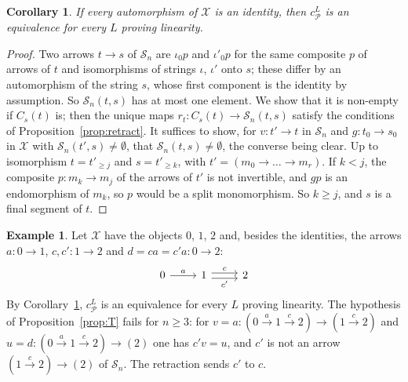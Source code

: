 \documentclass[11pt]{amsart}
\newtheorem{cor}[thm]{Corollary}
\theoremstyle{definition}
\newtheorem{ex}[thm]{Example}
\newcommand{\cX}{\mathcal X}
\newcommand{\cP}{\mathcal P}
\newcommand{\cS}{\mathcal S}
\begin{document}
\begin{cor}\label{cor:rigid}
If every automorphism of $\cX$ is an identity, then $c^L_\cP$ is an
equivalence for every $L$ proving linearity.
\end{cor}
\begin{proof}
Two arrows $t\to s$ of $\cS_n$ are $\iota_0p$ and $\iota'_0p$ for the
same composite $p$ of arrows of $t$ and isomorphisms of strings
$\iota$, $\iota'$ onto $s$; these differ by an automorphism of the
string $s$, whose first component is the identity by assumption. So $\cS_n(t,s)$ has
at most one element. We show that it is non-empty if $C_s(t)$ is;
then the unique maps $r_t\colon C_s(t)\to\cS_n(t,s)$ satisfy the
conditions of Proposition~\ref{prop:retract}. It suffices to show, for
$v\colon t'\to t$ in $\cS_n$ and $g\colon t_0\to s_0$ in $\cX$ with
$\cS_n(t',s)\ne\emptyset$, that $\cS_n(t,s)\ne\emptyset$, the converse
being clear. Up to isomorphism $t=t'_{\ge j}$ and $s=t'_{\ge k}$, with
$t'=(m_0\to\dots\to m_r)$. If $k<j$, the composite $p\colon m_k\to m_j$
of the arrows of $t'$ is not invertible, and $gp$ is an endomorphism
of $m_k$, so $p$ would be a split monomorphism. So $k\ge j$, and $s$
is a final segment of $t$.
\end{proof}

\begin{ex}\label{ex:parallel}
Let $\cX$ have the objects $0$, $1$, $2$ and, besides the identities,
the arrows $a\colon0\to1$, $c,c'\colon1\to2$ and $d=ca=c'a\colon0\to2$:
\[
\begin{tikzcd}
0\arrow[r,"a"]&1\arrow[r,shift left,"c"]\arrow[r,shift right,"c'"']&2
\end{tikzcd}
\]
By Corollary~\ref{cor:rigid}, $c^L_\cP$ is an equivalence for every $L$
proving linearity. The hypothesis of Proposition~\ref{prop:T} fails for
$n\ge3$: for $v=a\colon(0\xrightarrow{a}1\xrightarrow{c}2)\to
(1\xrightarrow{c}2)$ and $u=d\colon(0\xrightarrow{a}1\xrightarrow{c}2)
\to(2)$ one has $c'v=u$, and $c'$ is not an arrow
$(1\xrightarrow{c}2)\to(2)$ of $\cS_n$. The retraction sends $c'$ to
$c$.
\end{ex}
\end{document}
